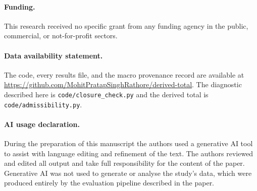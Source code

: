 \documentclass[11pt]{article}
\begin{document}
\paragraph{Funding.}

This research received no specific grant from any funding agency in the public,
commercial, or not-for-profit sectors.


\paragraph{Data availability statement.}

The code, every results file, and the macro provenance record are available at
\url{https://github.com/MohitPratapSinghRathore/derived-total}. The diagnostic
described here is \texttt{code/closure\_check.py} and the derived total is
\texttt{code/admissibility.py}.


\paragraph{AI usage declaration.}
During the preparation of this manuscript the authors used a generative AI tool to
assist with language editing and refinement of the text. The authors reviewed and
edited all output and take full responsibility for the content of the paper.
Generative AI was not used to generate or analyse the study's data, which were
produced entirely by the evaluation pipeline described in the paper.



\end{document}
